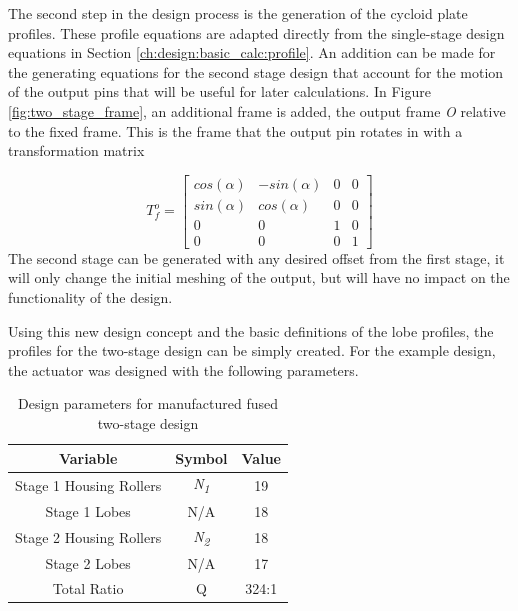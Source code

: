 The second step in the design process is the generation of the cycloid plate profiles. These profile equations are adapted directly from the single-stage design equations in Section \ref{ch:design:basic_calc:profile}. An addition can be made for the generating equations for the second stage design that account for the motion of the output pins that will be useful for later calculations. In Figure \ref{fig:two_stage_frame}, an additional frame is added, the output frame \textit{O} relative to the fixed frame. This is the frame that the output pin rotates in with a transformation matrix 

\begin{equation} \label{eq:T_fo}
T_f^o = \left[{\begin{array}{cccc}
		cos(\alpha) & -sin(\alpha) & 0 & 0\\
		sin(\alpha) & cos(\alpha) & 0 & 0\\
		0 & 0 & 1 & 0\\
		0 & 0 & 0 & 1 \end{array} } \right]
\end{equation}
The second stage can be generated with any desired offset from the first stage, it will only change the initial meshing of the output, but will have no impact on the functionality of the design. 

Using this new design concept and the basic definitions of the lobe profiles, the profiles for the two-stage design can be simply created. For the example design, the actuator was designed with the following parameters. 
\begin{table}[h]
  \vskip0.2cm
  \caption{Design parameters for manufactured fused two-stage design}
  \label{table:two_stage_design_params}
  \begin{center}
    \vskip-0.2cm
	\begin{tabular}{|c|c|c|}
		\hline
		Variable & Symbol & Value\\
		\hline
		Stage 1 Housing Rollers & \textit{N\textsubscript{1}} & 19\\
		\hline
		Stage 1 Lobes & N/A & 18\\
		\hline
		Stage 2 Housing Rollers & \textit{N\textsubscript{2}} & 18\\
		\hline
		Stage 2 Lobes & N/A & 17\\
		\hline
		Total Ratio & Q & 324:1 \\
		\hline
	\end{tabular}
  \end{center}
\end{table}

